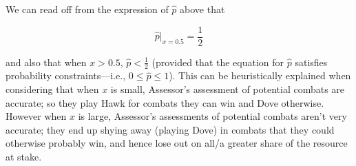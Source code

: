 \documentclass{article}
\begin{document}
We can read off from the expression of $\hat{p}$ above that

\begin{equation*}
    \hat{p}\bigr|_{x=0.5} = \frac{1}{2}
\end{equation*}

and also that when $x > 0.5$, $\hat{p} < \frac{1}{2}$ (provided that the
equation for $\hat{p}$ satisfies probability constraints---i.e., $0 \leq
\hat{p} \leq 1$). This can be heuristically explained when considering
that when $x$ is small, Assessor's assessment of potential combats are
accurate; so they play Hawk for combats they can win and Dove otherwise.
However when $x$ is large, Assessor's assessments of potential combats
aren't very accurate; they end up shying away (playing Dove) in combats
that they could otherwise probably win, and hence lose out on all/a
greater share of the resource at stake.
\end{document}
